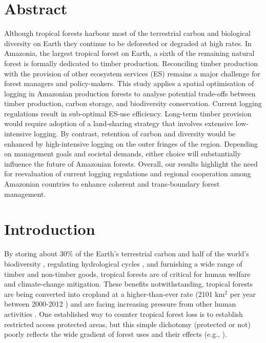 \documentclass{article}
\begin{document}
\section{Abstract}

Although tropical forests harbour most of the terrestrial carbon and biological diversity on Earth they continue to be deforested or degraded at high rates. In Amazonia, the largest tropical forest on Earth, a sixth of the remaining natural forest is formally dedicated to timber production. Reconciling  timber production with the provision of other ecosystem services (ES) remains a major challenge for forest managers and policy-makers. This study applies a spatial optimisation of logging in Amazonian production forests to analyse potential trade-offs between timber production, carbon storage, and biodiversity conservation. Current logging regulations result in sub-optimal ES-use efficiency. Long-term timber provision would require adoption of a land-sharing strategy that involves extensive low-intensive logging. By contrast, retention of carbon and diversity would be enhanced by high-intensive logging on the  outer fringes of the region. Depending on management goals and societal demands, either choice will substantially influence the future of Amazonian forests. Overall, our results highlight the need for reevaluation of current logging regulations and regional cooperation among Amazonian countries to enhance coherent and trans-boundary forest management.


\twocolumn

\section{Introduction}

By storing about 30\% of the Earth’s terrestrial carbon \cite{Pan2013} and half of the world’s biodiversity \cite{Pimm2014}, regulating hydrological cycles \cite{Fisher2009a}, and furnishing a wide range of timber and non-timber goods, tropical forests are of critical for human welfare and climate-change mitigation. These benefits notwithstanding, tropical forests are being converted into cropland at a higher-than-ever rate (2101 km$^2$ per year between 2000-2012 \cite{Hansen2013}) and are facing increasing pressure from other human activities \cite{Lewis2015}. One established way to counter  tropical forest loss is to establish restricted access protected areas, but this simple dichotomy (protected or not) poorly reflects the wide gradient of forest uses and their effects  (e.g., \cite{DeCastroSolar2015,Gibson2011}). 
\end{document}
